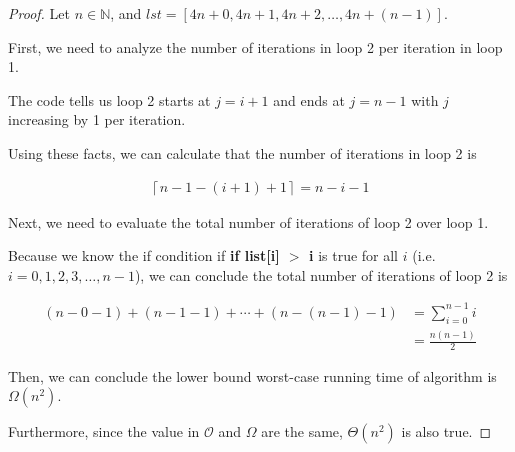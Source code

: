\documentclass[12pt]{article}
\begin{document}
\begin{enumerate}[a.]
\begin{proof}
        \bigskip

        Let $n \in \mathbb{N}$, and $lst = [4n + 0, 4n + 1, 4n + 2,\dots,4n + (n-1)]$.

        \bigskip

        First, we need to analyze the number of iterations in loop 2 per iteration
        in loop 1.

        \bigskip

        The code tells us loop 2 starts at $j = i + 1$ and ends at $j = n-1$ with
        $j$ increasing by 1 per iteration.

        \bigskip

        Using these facts, we can calculate that the number of iterations in
        loop 2 is

        \begin{align}
            \left\lceil n-1 - (i+1) + 1 \right\rceil = n - i - 1
        \end{align}

        \bigskip

        Next, we need to evaluate the total number of iterations of loop 2 over
        loop 1.

        \bigskip

        Because we know the if condition if \textbf{if list[i] $>$ i} is true for
        all $i$ (i.e. $i = 0,1,2,3,\dots,n-1$), we can conclude the total number
        of iterations of loop 2 is

        \begin{align}
            (n-0-1) + (n-1-1) + \cdots + (n - (n-1) - 1) &= \sum\limits_{i=0}^{n-1} i\\
            &= \frac{n(n-1)}{2}
        \end{align}

        \bigskip

        Then, we can conclude the lower bound worst-case running time of algorithm is
        $\Omega(n^2)$.

        \bigskip

        Furthermore, since the value in $\mathcal{O}$ and $\Omega$ are the same, $\Theta(n^2)$
        is also true.

    \end{proof}

\end{enumerate}
\end{document}
